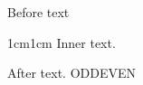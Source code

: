 \documentclass{memoir}
\begin{document}
Before text
\begin{adjustwidth}{1cm}{1cm}
Inner text.
\end{adjustwidth}
After text.
\checkoddpage\ifoddpage ODD\else EVEN\fi
\end{document}

